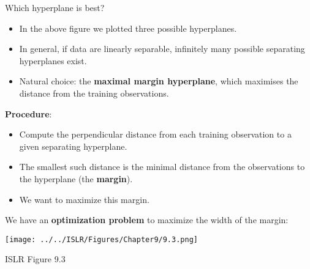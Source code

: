 \documentclass[10pt,ignorenonframetext,]{beamer}
\begin{document}
\begin{frame}

\begin{block}{Which hyperplane is best?}

\vspace{2mm}

\begin{itemize}
\item
  In the above figure we plotted three possible hyperplanes.
\item
  In general, if data are linearly separable, infinitely many possible
  separating hyperplanes exist.
\item
  Natural choice: the \textbf{maximal margin hyperplane}, which
  maximises the distance from the training observations.
\end{itemize}

\vspace{2mm}

\textbf{Procedure}:

\begin{itemize}
\item
  Compute the perpendicular distance from each training observation to a
  given separating hyperplane.
\item
  The smallest such distance is the minimal distance from the
  observations to the hyperplane (the \textbf{margin}).
\item
  We want to maximize this margin.
\end{itemize}

\end{block}

\end{frame}

\begin{frame}

We have an \textbf{optimization problem} to maximize the width of the
margin:

\centering

\texttt{[image: ../../ISLR/Figures/Chapter9/9.3.png]}
\small

ISLR Figure 9.3

\end{frame}
\end{document}
